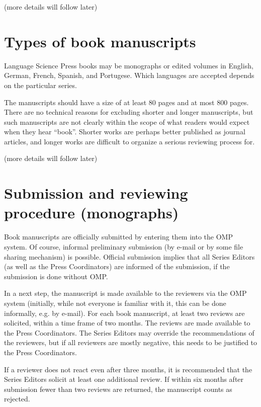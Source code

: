 (more details will follow later)

\section{Types of book manuscripts}

Language Science Press books may be monographs or edited volumes in English, German, French, Spanish,
and Portugese. Which languages are accepted depends on the particular series.

The manuscripts should have a size of at least 80 pages and at most 800 pages.
There are no technical reasons for excluding shorter and longer manuscripts, but such manuscripts
are not clearly within the scope of what readers would expect when they hear ``book''. Shorter works
are perhaps better published as journal articles, and longer works are difficult to organize a
serious reviewing process for.

(more details will follow later)


\section{Submission and reviewing procedure (monographs)}

Book manuscripts are officially submitted by entering them into the OMP system. Of course,
informal preliminary submission (by e-mail or by some file sharing mechanism) is
possible. Official submission implies that all Series Editors (as well as the Press Coordinators)
are informed of the submission, if the submission is done without OMP.


In a next step, the manuscript is made available to the reviewers via the OMP system (initially,
while not everyone is familiar with it, this can be done informally, e.g. by e-mail). For each book
manuscript, at least two reviews are solicited, within a time frame of two months. The reviews are
made available to the Press Coordinators. The Series Editors may override the recommendations of the
reviewers, but if all reviewers are mostly negative, this needs to be justified to the Press
Coordinators.

If a reviewer does not react even after three months, it is recommended that the Series Editors
solicit at least one additional review. If within six months after submission fewer than two reviews
are returned, the manuscript counts as rejected.

